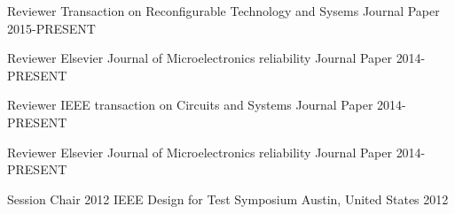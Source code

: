 

\begin{cvhonors}

  \cvhonor
    {Reviewer} %
    {Transaction on Reconfigurable Technology and Sysems} %
    {Journal Paper} %
    {2015-PRESENT} %


  \cvhonor
    {Reviewer} %
    {Elsevier Journal of Microelectronics reliability} %
    {Journal Paper} %
    {2014-PRESENT} %

  \cvhonor
    {Reviewer} %
    {IEEE transaction on Circuits and Systems} %
    {Journal Paper} %
    {2014-PRESENT} %

  \cvhonor
    {Reviewer} %
    {Elsevier Journal of Microelectronics reliability} %
    {Journal Paper} %
    {2014-PRESENT} %

  \cvhonor
    {Session Chair} %
    {2012 IEEE Design for Test Symposium} %
    {Austin, United States} %
    {2012} %

\end{cvhonors}
